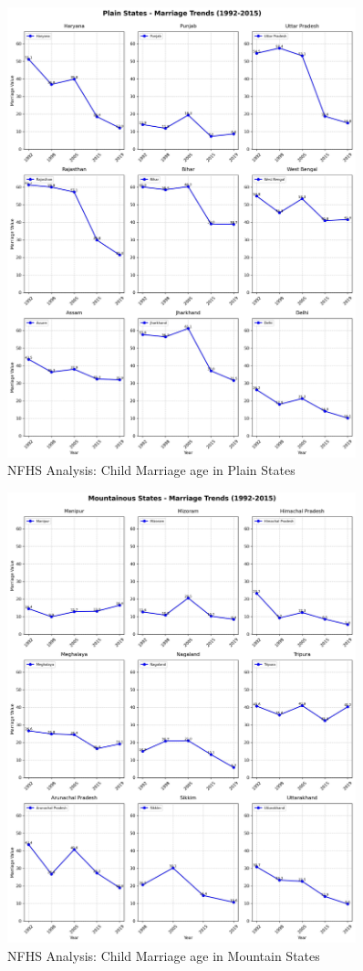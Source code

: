 \begin{figure}[H]
    \centering
    \includegraphics[width=0.9\textwidth]{figures/nfhs/plain_states_marriage_subplots.pdf}
    \caption{NFHS Analysis: Child Marriage age in Plain States}
    \label{fig:nfhs_plain_marriage}
\end{figure}



\begin{figure}[H]
    \centering
    \includegraphics[width=0.9\textwidth]{figures/nfhs/mountainous_states_marriage_subplots.pdf}
    \caption{NFHS Analysis: Child Marriage age in Mountain States}
    \label{fig:nfhs_mountain_marriage}
\end{figure}